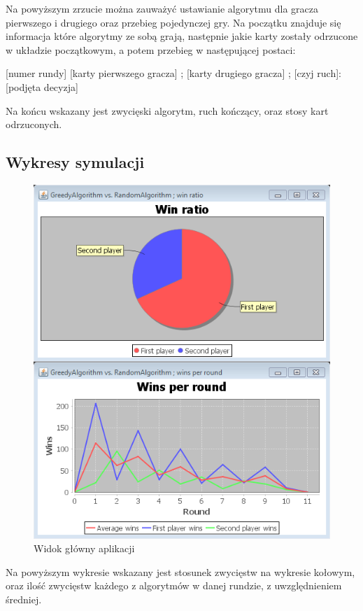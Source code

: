 Na powyższym zrzucie można zauważyć ustawianie algorytmu dla gracza pierwszego i drugiego oraz przebieg pojedynczej gry. Na początku znajduje się informacja które algorytmy ze sobą grają, następnie jakie karty zostały odrzucone w układzie początkowym, a potem przebieg w następującej postaci:
\begin{center}
	[numer rundy] [karty pierwszego gracza] ; [karty drugiego gracza] ; [czyj ruch]: [podjęta decyzja]
\end{center}
Na końcu wskazany jest zwycięski algorytm, ruch kończący, oraz stosy kart odrzuconych.

\subsection*{Wykresy symulacji}
\begin{figure}[H]
	\centering
	\includegraphics[]{Resources/winCharts.PNG}
	\caption{Widok główny aplikacji} 
	\label{fig:winChart}
\end{figure}

Na powyższym wykresie wskazany jest stosunek zwycięstw na wykresie kołowym, oraz ilość zwycięstw każdego z algorytmów w danej rundzie, z uwzględnieniem średniej.

